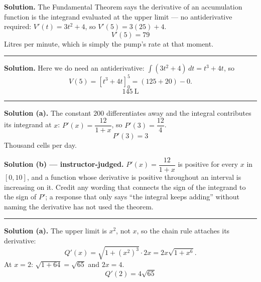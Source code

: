 \documentclass[12pt]{article}
\begin{document}



\textbf{Solution.} The Fundamental Theorem says the derivative of an
accumulation function is the integrand evaluated at the upper limit --- no
antiderivative required: $V'(t) = 3t^2 + 4$, so $V'(5) = 3(25) + 4$.
\[ \boxed{V'(5) = 79} \]
Litres per minute, which is simply the pump's rate at that moment.

\vspace{0.15cm}\noindent\rule{\linewidth}{0.2pt}


\textbf{Solution.} Here we do need an antiderivative:
$\int (3t^2 + 4)\,dt = t^3 + 4t$, so
\[ V(5) = \left[t^3 + 4t\right]_0^5 = (125 + 20) - 0. \]
\[ \boxed{145\ \text{L}} \]

\vspace{0.15cm}\noindent\rule{\linewidth}{0.2pt}


\textbf{Solution (a).} The constant $200$ differentiates away and the integral
contributes its integrand at $x$: $P'(x) = \dfrac{12}{1 + x}$, so
$P'(3) = \dfrac{12}{4}$.
\[ \boxed{P'(3) = 3} \]
Thousand cells per day.

\textbf{Solution (b) --- instructor-judged.} $P'(x) = \dfrac{12}{1 + x}$ is
positive for every $x$ in $[0, 10]$, and a function whose derivative is positive
throughout an interval is increasing on it. Credit any wording that connects the
sign of the integrand to the sign of $P'$; a response that only says ``the
integral keeps adding'' without naming the derivative has not used the theorem.

\vspace{0.15cm}\noindent\rule{\linewidth}{0.2pt}


\textbf{Solution (a).} The upper limit is $x^2$, not $x$, so the chain rule
attaches its derivative:
\[ Q'(x) = \sqrt{1 + (x^2)^3}\cdot 2x = 2x\sqrt{1 + x^6}. \]
At $x = 2$: $\sqrt{1 + 64} = \sqrt{65}$ and $2x = 4$.
\[ \boxed{Q'(2) = 4\sqrt{65}} \]
\end{document}
